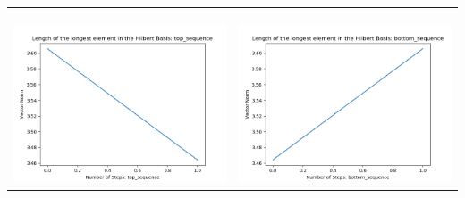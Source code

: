 \documentclass[10pt]{article}
\begin{document}
\begin{tabular}{c|c}
\begin{minipage}{.45\textwidth}
\end{minipage} \\ \\
\hline \\\begin{minipage}{.45\textwidth}
\includegraphics[width=\textwidth]{"DATA/4d/4 generators 2 bound I/top_sequence LENGTH"}
\end{minipage} &
\begin{minipage}{.45\textwidth}
\includegraphics[width=\textwidth]{"DATA/4d/4 generators 2 bound I bottomup/bottom_sequence LENGTH"}
\end{minipage}
\end{tabular}
\end{document}
